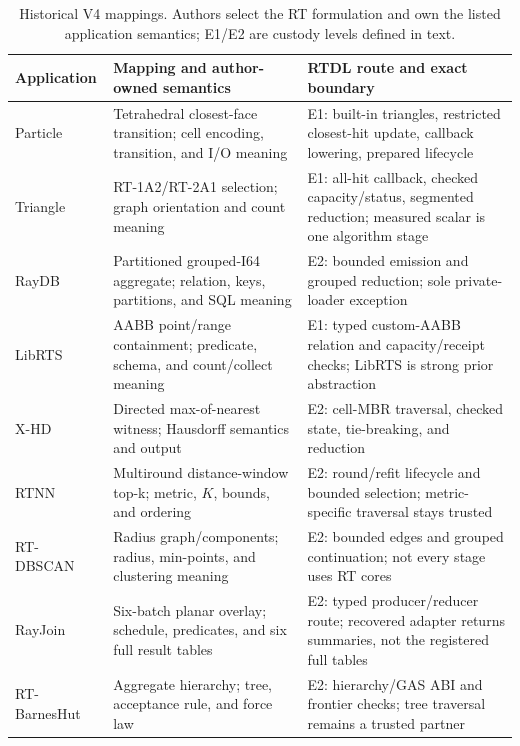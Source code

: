\documentclass[sigplan,screen,review,anonymous]{acmart}
\begin{document}
\begin{table}[t]
  \caption{Historical V4 mappings. Authors select the RT formulation and own
  the listed application semantics; E1/E2 are custody levels defined in text.}
  \label{tab:apps}
  \scriptsize
  \begin{tabularx}{\textwidth}{@{}p{}p{}X@{}}
    \toprule
    Application & Mapping and author-owned semantics & RTDL route and exact boundary \\
    \midrule
    Particle~\cite{wang2022particle} & Tetrahedral closest-face transition; cell encoding, transition, and I/O meaning & E1: built-in triangles, restricted closest-hit update, callback lowering, prepared lifecycle \\
    Triangle~\cite{xiao2025rtgraph} & RT-1A2/RT-2A1 selection; graph orientation and count meaning & E1: all-hit callback, checked capacity/status, segmented reduction; measured scalar is one algorithm stage \\
    RayDB~\cite{shi2025raydb} & Partitioned grouped-I64 aggregate; relation, keys, partitions, and SQL meaning & E2: bounded emission and grouped reduction; sole private-loader exception \\
    LibRTS~\cite{geng2025librts} & AABB point/range containment; predicate, schema, and count/collect meaning & E1: typed custom-AABB relation and capacity/receipt checks; LibRTS is strong prior abstraction \\
    X-HD~\cite{geng2026xhd} & Directed max-of-nearest witness; Hausdorff semantics and output & E2: cell-MBR traversal, checked state, tie-breaking, and reduction \\
    RTNN~\cite{zhu2022rtnn} & Multiround distance-window top-k; metric, $K$, bounds, and ordering & E2: round/refit lifecycle and bounded selection; metric-specific traversal stays trusted \\
    RT-DBSCAN~\cite{nagarajan2023rtdbscan} & Radius graph/components; radius, min-points, and clustering meaning & E2: bounded edges and grouped continuation; not every stage uses RT cores \\
    RayJoin~\cite{geng2024rayjoin} & Six-batch planar overlay; schedule, predicates, and six full result tables & E2: typed producer/reducer route; recovered adapter returns summaries, not the registered full tables \\
    RT-BarnesHut~\cite{nagarajan2025rtbarneshut} & Aggregate hierarchy; tree, acceptance rule, and force law & E2: hierarchy/GAS ABI and frontier checks; tree traversal remains a trusted partner \\
    \bottomrule
  \end{tabularx}
\end{table}
\end{document}
